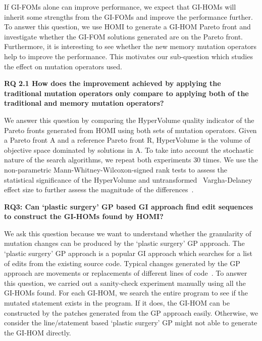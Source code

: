 \documentclass[oribibl]{llncs}
\begin{document}
If GI-FOMs alone can improve performance, we expect that GI-HOMs will inherit some strengths from the GI-FOMs and improve the performance further. To answer this question, we use HOMI to generate a GI-HOM Pareto front and investigate whether the GI-FOM solutions generated are on the Pareto front. Furthermore, it is interesting to see whether the new memory mutation operators help to improve the performance. This motivates our sub-question which studies the effect on mutation operators used. 

\vspace{2mm}
\noindent\textbf{RQ 2.1 How does the improvement achieved by applying the traditional mutation operators only compare to applying both of the traditional and memory mutation operators? }
\vspace{2mm}

We answer this question by comparing the HyperVolume quality indicator of the Pareto fronts generated from HOMI using both sets of mutation operators. Given a Pareto front A and a reference Pareto front R, HyperVolume is the volume of objective space dominated by solutions in A. To take into account the stochastic nature of the search algorithms, we repeat both experiments 30 times. We use the non-parametric Mann-Whitney-Wilcoxon-signed rank tests to assess the statistical significance of the HyperVolume and untransformed~\cite{Neumann2015} Vargha-Delaney effect size to further assess the magnitude of the differences~\cite{STVR:STVR1486}. 

\vspace{2mm}
\noindent\textbf{RQ3: Can `plastic surgery' GP based GI approach find edit sequences to construct the GI-HOMs found by HOMI?}
\vspace{2mm}

We ask this question because we want to understand whether the granularity of mutation changes can be produced by the `plastic surgery' GP approach. The `plastic surgery' GP approach is a popular GI approach which searches for a list of edits from the existing source code. Typical changes generated by the GP approach are movements or replacements of different lines of code~\cite{justyna2013, 6733370}. To answer this question, we carried out a sanity-check experiment manually using all the GI-HOMs found. For each GI-HOM, we search the entire program to see if the mutated statement exists in the program. If it does, the GI-HOM can be constructed by the patches generated from the GP approach easily. Otherwise, we consider the line/statement based `plastic surgery' GP might not able to generate the GI-HOM directly. 
\end{document}
